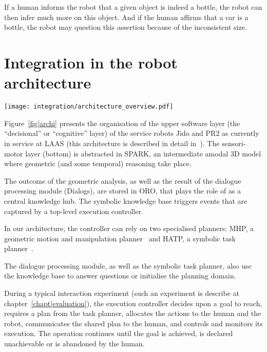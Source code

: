 If a human informs the robot that a given object is indeed a bottle, the robot
can then infer much more on this object. And if the human affirms that a car is
a bottle, the robot may question this assertion because of the inconsistent
size.

\section{Integration in the robot architecture}
\label{sect|integration}

\begin{figure*}[thpb]
  \centering
  \texttt{[image: integration/architecture\_overview.pdf]}

  \caption {Software architecture of PR2 and Jido, two service robot
  interacting with humans at LAAS-CNRS.}

  \label{fig|archi}
\end{figure*}

Figure~\ref{fig|archi} presents the organisation of the upper software layer
(the ``decisional'' or ``cognitive'' layer) of the service robots Jido and PR2
as currently in service at LAAS (this architecture is described in detail
in~\cite{Alami2011}). The sensori-motor layer (bottom) is abstracted in SPARK,
an intermediate amodal 3D model where geometric (and some temporal) reasoning
take place.

The outcome of the geometric analysis, as well as the result of the dialogue
processing module ({\sc Dialogs}), are stored in ORO, that plays the role of as
a central knowledge hub. The symbolic knowledge base triggers events that are
captured by a top-level execution controller.

In our architecture, the controller can rely on two specialised planners: MHP,
a geometric motion and manipulation planner~\cite{Sisbot2008, Mainprice2011,
Pandey2010} and HATP, a symbolic task planner~\cite{Alili2009}.

The dialogue processing module, as well as the symbolic task planner, also use
the knowledge base to answer questions or initialise the planning domain.

During a typical interaction experiment (such an experiment is describe at
chapter~\ref{chapt|evaluation}), the execution controller decides upon a goal
to reach, requires a plan from the task planner, allocates the actions to the
human and the robot, communicates the shared plan to the human, and controls
and monitors its execution. The operation continues until the goal is achieved,
is declared unachievable or is abandoned by the human.

